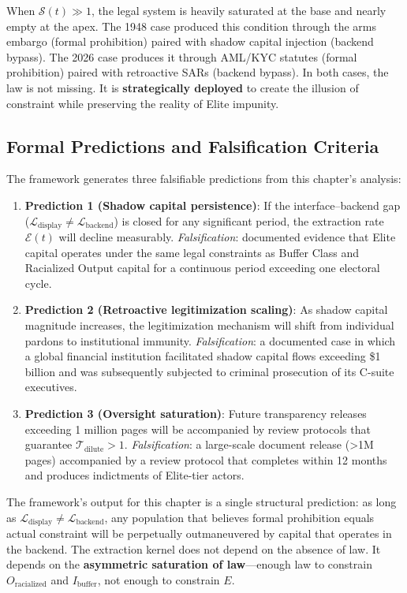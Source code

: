 When $\mathcal{S}(t) \gg 1$, the legal system is heavily saturated at the base and nearly empty at the apex. The 1948 case produced this condition through the arms embargo (formal prohibition) paired with shadow capital injection (backend bypass). The 2026 case produces it through AML/KYC statutes (formal prohibition) paired with retroactive SARs (backend bypass). In both cases, the law is not missing. It is \textbf{strategically deployed} to create the illusion of constraint while preserving the reality of Elite impunity.

\subsection{Formal Predictions and Falsification Criteria}

The framework generates three falsifiable predictions from this chapter's analysis:

\begin{enumerate}
    \item \textbf{Prediction 1 (Shadow capital persistence)}: If the interface--backend gap ($\mathcal{L}_{\text{display}} \neq \mathcal{L}_{\text{backend}}$) is closed for any significant period, the extraction rate $\mathcal{E}(t)$ will decline measurably. \textit{Falsification}: documented evidence that Elite capital operates under the same legal constraints as Buffer Class and Racialized Output capital for a continuous period exceeding one electoral cycle.
    \item \textbf{Prediction 2 (Retroactive legitimization scaling)}: As shadow capital magnitude increases, the legitimization mechanism will shift from individual pardons to institutional immunity. \textit{Falsification}: a documented case in which a global financial institution facilitated shadow capital flows exceeding \$1 billion and was subsequently subjected to criminal prosecution of its C-suite executives.
    \item \textbf{Prediction 3 (Oversight saturation)}: Future transparency releases exceeding 1 million pages will be accompanied by review protocols that guarantee $\mathcal{T}_{\text{dilute}} > 1$. \textit{Falsification}: a large-scale document release (>1M pages) accompanied by a review protocol that completes within 12 months and produces indictments of Elite-tier actors.
\end{enumerate}

The framework's output for this chapter is a single structural prediction: as long as $\mathcal{L}_{\text{display}} \neq \mathcal{L}_{\text{backend}}$, any population that believes formal prohibition equals actual constraint will be perpetually outmaneuvered by capital that operates in the backend. The extraction kernel does not depend on the absence of law. It depends on the \textbf{asymmetric saturation of law}---enough law to constrain $O_{\text{racialized}}$ and $I_{\text{buffer}}$, not enough to constrain $E$.


